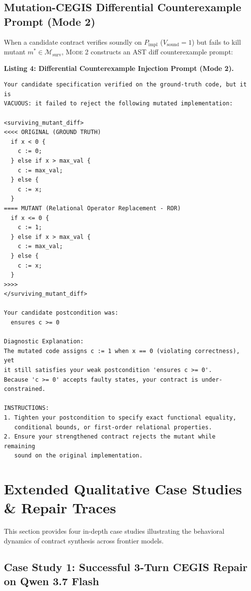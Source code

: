 \documentclass{article}
\begin{document}
\subsection{Mutation-CEGIS Differential Counterexample Prompt (Mode 2)}
\label{app:prompt_mode2}

When a candidate contract verifies soundly on $P_{\text{impl}}$ ($V_{\text{sound}} = 1$) but fails to kill mutant $m^* \in \mathcal{M}_{\text{surv}}$, \textsc{Mode 2} constructs an AST diff counterexample prompt:

\vspace{0.3em}
\noindent\textbf{Listing 4: Differential Counterexample Injection Prompt (Mode 2).}
{\footnotesize
\begin{verbatim}
Your candidate specification verified on the ground-truth code, but it is
VACUOUS: it failed to reject the following mutated implementation:

<surviving_mutant_diff>
<<<< ORIGINAL (GROUND TRUTH)
  if x < 0 {
    c := 0;
  } else if x > max_val {
    c := max_val;
  } else {
    c := x;
  }
==== MUTANT (Relational Operator Replacement - ROR)
  if x <= 0 {
    c := 1;
  } else if x > max_val {
    c := max_val;
  } else {
    c := x;
  }
>>>>
</surviving_mutant_diff>

Your candidate postcondition was:
  ensures c >= 0

Diagnostic Explanation:
The mutated code assigns c := 1 when x == 0 (violating correctness), yet
it still satisfies your weak postcondition 'ensures c >= 0'.
Because 'c >= 0' accepts faulty states, your contract is under-constrained.

INSTRUCTIONS:
1. Tighten your postcondition to specify exact functional equality,
   conditional bounds, or first-order relational properties.
2. Ensure your strengthened contract rejects the mutant while remaining
   sound on the original implementation.
\end{verbatim}
}

\section{Extended Qualitative Case Studies \& Repair Traces}
\label{app:case_studies}

This section provides four in-depth case studies illustrating the behavioral dynamics of contract synthesis across frontier models.

\subsection{Case Study 1: Successful 3-Turn CEGIS Repair on Qwen 3.7 Flash}
\end{document}
